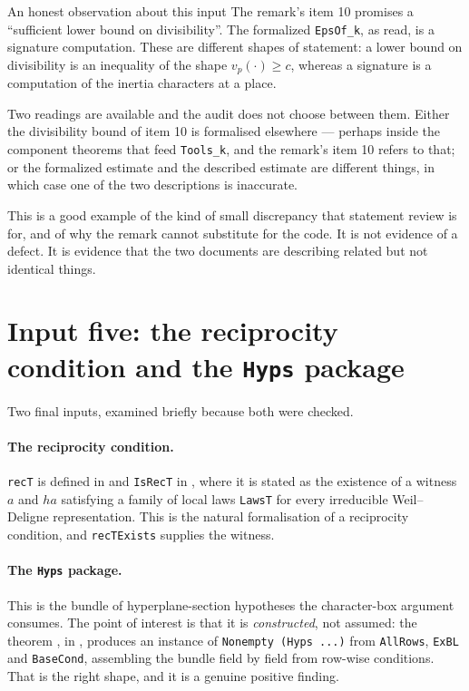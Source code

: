\begin{seamnote}{An honest observation about this input}
The remark's item 10 promises a ``sufficient lower bound on divisibility''.
The formalized \texttt{EpsOf\_k}, as read, is a signature computation. These
are different shapes of statement: a lower bound on divisibility is an
inequality of the shape $v_p(\cdot) \ge c$, whereas a signature is a
computation of the inertia characters at a place.

Two readings are available and the audit does not choose between them. Either
the divisibility bound of item 10 is formalised elsewhere --- perhaps inside
the component theorems that feed \texttt{Tools\_k}, and the remark's item 10
refers to that; or the formalized estimate and the described estimate are
different things, in which case one of the two descriptions is inaccurate.

This is a good example of the kind of small discrepancy that statement review
is for, and of why the remark cannot substitute for the code. It is not
evidence of a defect. It is evidence that the two documents are describing
related but not identical things.
\end{seamnote}

\section{Input five: the reciprocity condition and the \texttt{Hyps} package}Two final inputs, examined briefly because both were checked.

\paragraph{The reciprocity condition.} \texttt{recT} is defined in
 and
\texttt{IsRecT} in ,
where it is stated as the existence of a witness $a$ and $ha$ satisfying a
family of local laws \texttt{LawsT} for every irreducible Weil--Deligne
representation. This is the natural formalisation of a reciprocity
condition, and \texttt{recTExists} supplies the witness.

\paragraph{The \texttt{Hyps} package.} This is the bundle of hyperplane-section
hypotheses the character-box argument consumes. The point of interest is that
it is \emph{constructed}, not assumed: the theorem
, in
, produces
an instance of \texttt{Nonempty (Hyps ...)} from \texttt{AllRows},
\texttt{ExBL} and \texttt{BaseCond}, assembling the bundle field by field
from row-wise conditions. That is the right shape, and it is a genuine
positive finding.

